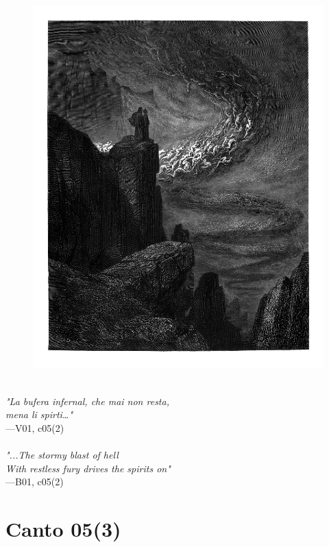 \documentclass[../Dore_vision.tex]{subfiles}
\begin{document}
\begin{figure}[ht]
\centering
\includegraphics[height=\figsize]{illustrations/book_1/V01, c05(2).jpg}
\end{figure}

\begin{center}
\begin{minipage}{0.8\linewidth}
\textit{\\
"La bufera infernal, che mai non resta,\\mena li spirti…"} \\
—V01, c05(2) \\~\\
\textit{"...The stormy blast of hell\\With restless fury drives the spirits on"} \\
—B01, c05(2)
\end{minipage}
\end{center}

\newpage

\section{Canto 05(3)}
\end{document}
